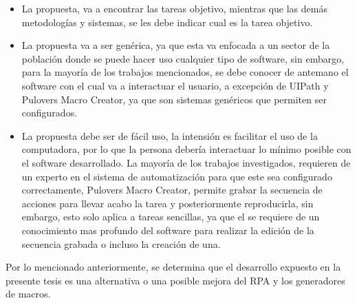 \begin{itemize}

\item {La propuesta, va a encontrar las tareas objetivo, mientras que las
 dem\'as metodolog\'ias y sistemas, se les debe indicar cual es la tarea
 objetivo.}

\item {La propuesta va a ser gen\'erica, ya que esta va enfocada a un sector
 de la poblaci\'on donde se puede hacer uso cualquier tipo de software, sin
 embargo, para la mayor\'ia de los trabajos mencionados, se debe conocer de
 antemano el software con el cual va a interactuar el usuario, a excepci\'on
 de UIPath y Pulover\textsc{}s Macro Creator, ya que son sistemas
 gen\'ericos que permiten ser configurados.}

\item {La propuesta debe ser de f\'acil uso, la intensi\'on es facilitar el
 uso de la computadora, por lo que la persona deber\'ia interactuar lo
 m\'inimo posible con el software desarrollado. La mayor\'ia de los trabajos 
 investigados, requieren de un experto en el sistema de automatizaci\'on para 
 que este sea configurado correctamente, Pulover\textsc{}s Macro 
 Creator, permite grabar la secuencia de acciones para llevar acabo la tarea 
 y posteriormente reproducirla, sin embargo, esto solo aplica a tareas 
 sencillas, ya que el se requiere de un conocimiento mas profundo del 
 software para realizar la edici\'on de la secuencia grabada o incluso la 
 creaci\'on de una.}

\end{itemize}


Por lo mencionado anteriormente, se determina que el desarrollo expuesto en
 la presente tesis es una alternativa o una posible mejora del RPA y los
 generadores de macros.
